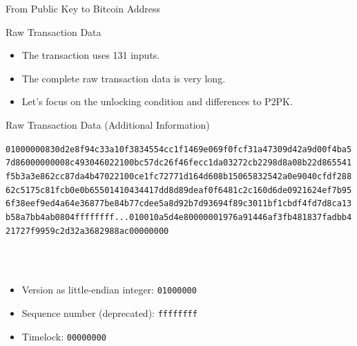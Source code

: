 \documentclass[]{beamer}
\begin{document}
\begin{frame}{From Public Key to Bitcoin Address}
\begin{figure}
	
\end{figure}
\end{frame}

\begin{frame}{Raw Transaction Data}
	\begin{itemize}
		\item The transaction uses 131 inputs.
		\item The complete raw transaction data is very long.
		\item Let's focus on the unlocking condition and differences to P2PK.
	\end{itemize}
\end{frame}

\begin{frame}{Raw Transaction Data (Additional Information)}
\begin{scriptsize}
\texttt{\alert<1>{01000000}\textcolor{black!50}{830d2e8f94c33a10f3834554cc1f1469e069f0fcf31a47309d42a9d00f4ba5
7d86000000008c493046022100bc57dc26f46fecc1da03272cb2298d8a08b22d865541
f5b3a3e862cc87da4b47022100ce1fc72771d164d608b15065832542a0e9040cfdf288
62c5175c81fcb0e0b65501410434417dd8d89deaf0f6481c2c160d6de0921624ef7b95
6f38eef9ed4a64e36877be84b77cdee5a8d92b7d93694f89c3011bf1cbdf4fd7d8ca13
b58a7bb4ab0804}\alert<2>{ffffffff}\textcolor{black!50}{...010010a5d4e80000001976a91446af3fb481837fadbb4
21727f9959c2d32a3682988ac}\alert<3>{00000000}}
\end{scriptsize}
\vspace{1em}
\scriptsize \\
\\
\begin{itemize}
	\item \alert<1>{Version as little-endian integer: \texttt{01000000}}
	\item \alert<2>{Sequence number (deprecated): \texttt{ffffffff}}
	\item \alert<3>{Timelock: \texttt{00000000}}
\end{itemize}
\end{frame}
\end{document}
